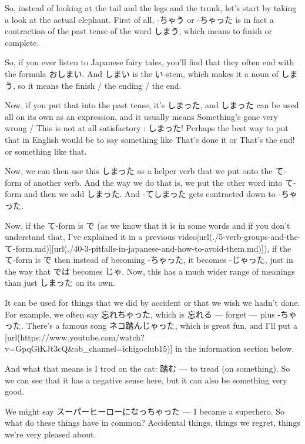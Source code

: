 So, instead of looking at the tail and the legs and the trunk, let's start by taking a look at the actual elephant. First of all, -ちゃう or -ちゃった is in fact a contraction of the past tense of the word しまう, which means to finish or complete.

{}

So, if you ever listen to Japanese fairy tales, you'll find that they often end with the formula おしまい. And しまい is the い-stem, which makes it a noun of しまう, so it means the finish / the ending / the end.

{}

Now, if you put that into the past tense, it's しまった, and しまった can be used all on its own as an expression, and it usually means Something's gone very wrong / This is not at all satisfactory : しまった! Perhaps the best way to put that in English would be to say something like That's done it or That's the end! or something like that.

Now, we can then use this しまった as a helper verb that we put onto the て-form of another verb. And the way we do that is, we put the other word into て-form and then we add しまった. And -てしまった gets contracted down to -ちゃった.

{}

Now, if the て-form is で (as we know that it is in some words and if you don't understand that, I've explained it in a previous video\goto{{[}5{]}}[url(./5-verb-groups-and-the-て-form.md)]\goto{{[}40{]}}[url(./40-3-pitfalls-in-japanese-and-how-to-avoid-them.md)]), if the て-form is で then instead of becoming -ちゃった, it becomes -じゃった, just in the way that では becomes じゃ. Now, this has a much wider range of meanings than just しまった on its own.

It can be used for things that we did by accident or that we wish we hadn't done. For example, we often say 忘れちゃった, which is 忘れる --- forget --- plus -ちゃった. There's a famous song ネコ踏んじゃった, which is great fun, and I'll put a [url(https://www.youtube.com/watch?v=GpqGiKJt3cQ&ab_channel=ichigoclub15)] in the information section below.

And what that means is I trod on the cat: 踏む --- to tread (on something). So we can see that it has a negative sense here, but it can also be something very good.

We might say スーパーヒーローになっちゃった --- I became a superhero. So what do these things have in common? Accidental things, things we regret, things we're very pleased about.

